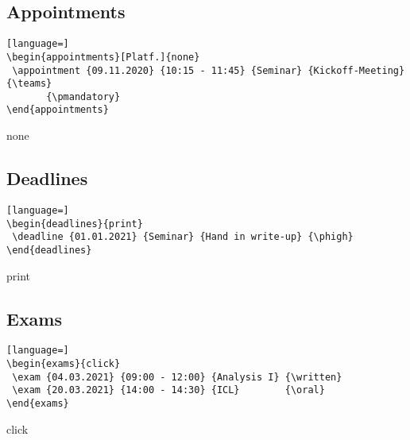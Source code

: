 \documentclass[english]{article}
\begin{document}
	
	\subsection{Appointments}
	\begin{lstlisting}[language=]
\begin{appointments}[Platf.]{none}	
 \appointment {09.11.2020} {10:15 - 11:45} {Seminar} {Kickoff-Meeting} {\teams} 
       {\pmandatory} 
\end{appointments}
	\end{lstlisting}
	\begin{appointments}[Platf.]{none}	
	\end{appointments}


	\subsection{Deadlines}
	\begin{lstlisting}[language=]
\begin{deadlines}{print}
 \deadline {01.01.2021} {Seminar} {Hand in write-up} {\phigh}
\end{deadlines}
	\end{lstlisting}
	\begin{deadlines}{print}
	\end{deadlines}

	\subsection{Exams}
	\begin{lstlisting}[language=]
\begin{exams}{click}
 \exam {04.03.2021} {09:00 - 12:00} {Analysis I} {\written}
 \exam {20.03.2021} {14:00 - 14:30} {ICL}        {\oral}
\end{exams}
	\end{lstlisting}
	\begin{exams}{click}
	\end{exams}
\end{document}
